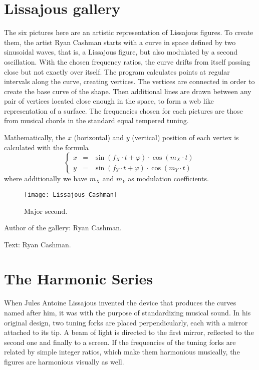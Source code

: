\section{Lissajous gallery}
The six pictures here are an artistic representation of Lissajous figures. To create them, the artist Ryan Cashman starts with a curve in space defined by two sinusoidal waves, that is, a Lissajous figure, but also modulated by a second oscillation. With the chosen frequency ratios, the curve drifts from itself passing close but not exactly over itself. The program calculates points at regular intervals along the curve, creating vertices. The vertices are connected in order to create the base curve of the shape. Then additional lines are drawn between any pair of vertices located close enough in the space, to form a web like representation of a surface. The frequencies chosen for each pictures are those from musical chords in the standard equal tempered tuning.

Mathematically, the $x$ (horizontal) and $y$ (vertical) position of each vertex is calculated with the formula
$$\left\{ \begin{array}{rcl}
x &=& \sin(f_X\cdot t + \varphi) \cdot \cos(m_X \cdot t) \\
y &=& \sin(f_Y\cdot t + \varphi) \cdot \cos(m_Y \cdot t)
\end{array} \right. $$
where additionally we have $m_X$ and $m_Y$ as modulation coefficients.


\begin{figure}[!h]
\centering
\texttt{[image: Lissajous\_Cashman]}
\caption*{Major second.}
\end{figure}


\begin{sectcredits}
\item[Author of the gallery:] Ryan Cashman.
\item[Text:] Ryan Cashman.
\end{sectcredits}

\section{The Harmonic Series}
When Jules Antoine Lissajous invented the device that produces the curves named after him, it was with the purpose of standardizing musical sound. In his original design, two tuning forks are placed perpendicularly, each with a mirror attached to its tip. A beam of light is directed to the first mirror, reflected to the second one and finally to a screen. If the frequencies of the tuning forks are related by simple integer ratios, which make them harmonious musically, the figures are harmonious visually as well.


